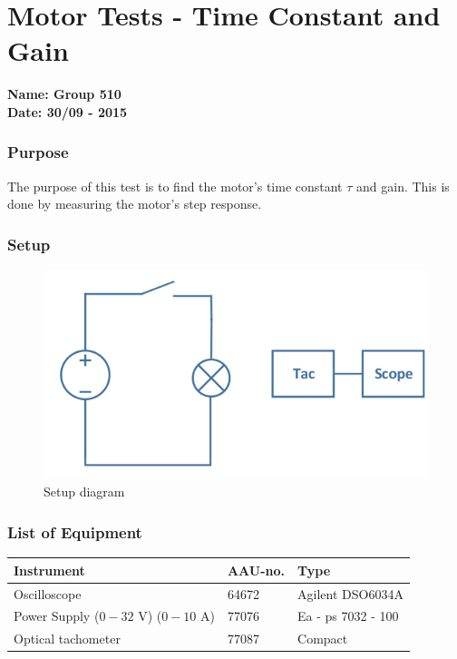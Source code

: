 \pagebreak
\section{Motor Tests - Time Constant and Gain} \label{app:motorTestTimeConstantAndGain}
\textbf{Name: Group 510}\\
\textbf{Date: 30/09 - 2015}

\subsubsection{Purpose}
The purpose of this test is to find the motor's time constant $\tau$ and gain. This is done by measuring the motor's step response.

\subsubsection{Setup}
\begin{figure}[H]
  \centering
	\includegraphics[scale=0.5]{figures/MotorTest8.png}
	\caption{Setup diagram}
\end{figure}

\subsubsection{List of Equipment}

\begin{table}[H]
\begin{tabular}{|l|l|p{4cm}|}
\hline%
  \textbf{Instrument}                        &  \textbf{AAU-no.}  &  \textbf{Type}       \\
\hline%
  Oscilloscope                               &  64672             &  Agilent DSO6034A    \\
\hline%
  Power Supply ($0 - 32$ V) ($0 - 10$ A)     &  77076             &  Ea - ps 7032 - 100  \\
\hline%
  Optical tachometer                         &  77087             &  Compact             \\
\hline%
\end{tabular}
\end{table}

